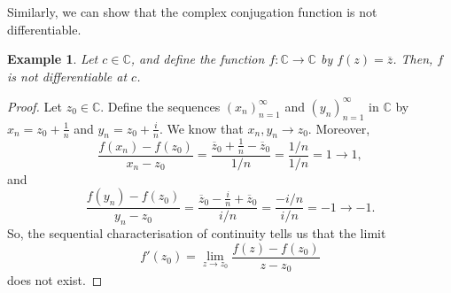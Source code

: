 \documentclass[a4paper, openany]{memoir}
\theoremstyle{definition}
\theoremstyle{plain}
\newtheorem{example}[definition]{Example}
\begin{document}
Similarly, we can show that the complex conjugation function is not differentiable.
\begin{example}
Let $c \in \mathbb{C}$, and define the function $f: \mathbb{C} \to \mathbb{C}$ by $f(z) = \overline{z}$. Then, $f$ is not differentiable at $c$.
\end{example}
\begin{proof}
Let $z_0 \in \mathbb{C}$. Define the sequences $(x_n)_{n=1}^{\infty}$ and $(y_n)_{n=1}^{\infty}$ in $\mathbb{C}$ by $x_n = z_0 + \frac{1}{n}$ and $y_n = z_0 + \frac{i}{n}$. We know that $x_n, y_n \to z_0$. Moreover,
\[\frac{f(x_n) - f(z_0)}{x_n - z_0} = \frac{\overline{z}_0 + \frac{1}{n} - \overline{z}_0}{1/n} = \frac{1/n}{1/n} = 1 \to 1,\]
and
\[\frac{f(y_n) - f(z_0)}{y_n - z_0} = \frac{\overline{z}_0 - \frac{i}{n} + \overline{z}_0}{i/n} = \frac{-i/n}{i/n} = -1 \to -1.\]
So, the sequential characterisation of continuity tells us that the limit
\[f'(z_0) = \lim_{z \to z_0} \frac{f(z) - f(z_0)}{z - z_0}\]
does not exist.
\end{proof}
\end{document}
